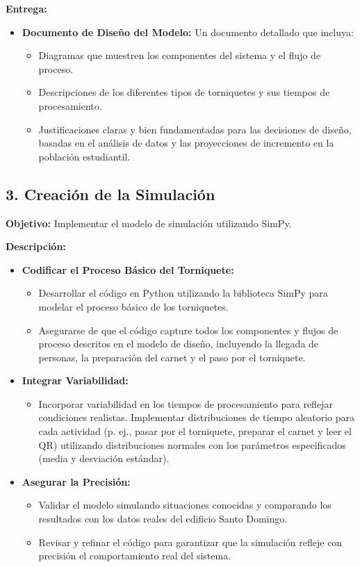 \documentclass[12pt]{article}
\begin{document}
\textbf{Entrega:}
\begin{itemize}
    \item \textbf{Documento de Diseño del Modelo:} Un documento detallado que incluya:
    \begin{itemize}
        \item Diagramas que muestren los componentes del sistema y el flujo de proceso.
        \item Descripciones de los diferentes tipos de torniquetes y sus tiempos de procesamiento.
        \item Justificaciones claras y bien fundamentadas para las decisiones de diseño, basadas en el análisis de datos y las proyecciones de incremento en la población estudiantil.
    \end{itemize}
\end{itemize}


\subsection*{3. Creación de la Simulación}
\textbf{Objetivo:} Implementar el modelo de simulación utilizando SimPy.

\textbf{Descripción:}
\begin{itemize}
    \item \textbf{Codificar el Proceso Básico del Torniquete:}
    \begin{itemize}
        \item Desarrollar el código en Python utilizando la biblioteca SimPy para modelar el proceso básico de los torniquetes.
        \item Asegurarse de que el código capture todos los componentes y flujos de proceso descritos en el modelo de diseño, incluyendo la llegada de personas, la preparación del carnet y el paso por el torniquete.
    \end{itemize}
    
    \item \textbf{Integrar Variabilidad:}
    \begin{itemize}
        \item Incorporar variabilidad en los tiempos de procesamiento para reflejar condiciones realistas. Implementar distribuciones de tiempo aleatorio para cada actividad (p. ej., pasar por el torniquete, preparar el carnet y leer el QR) utilizando distribuciones normales con los parámetros especificados (media y desviación estándar).
    \end{itemize}
    
    \item \textbf{Asegurar la Precisión:}
    \begin{itemize}
        \item Validar el modelo simulando situaciones conocidas y comparando los resultados con los datos reales del edificio Santo Domingo.
        \item Revisar y refinar el código para garantizar que la simulación refleje con precisión el comportamiento real del sistema.
    \end{itemize}
\end{itemize}
\end{document}
